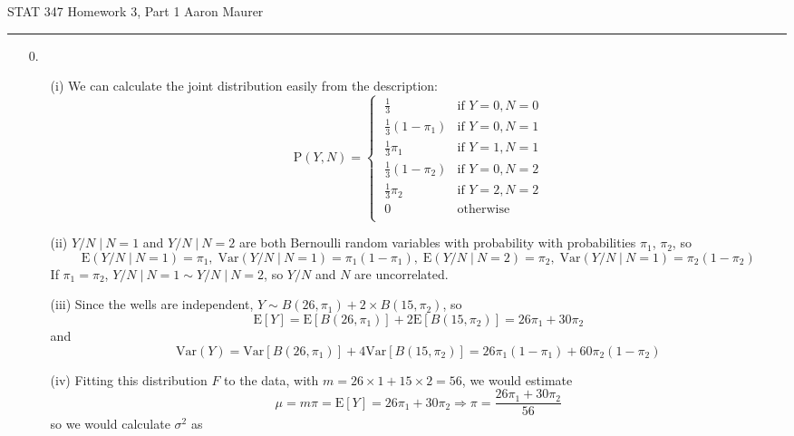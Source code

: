 \documentclass[11pt]{article}
\newcommand{\p}{\mathrm{P}}
\newcommand{\E}{\mathrm{E}}
\newcommand{\var}{\mathrm{Var}}
\newcommand{\st}{ \; \big | \:}
\theoremstyle{definition}
\newcommand{\hwhead}[1]{#1 \hfill Aaron Maurer \vspace{2mm} \hrule \vspace{2mm}}
\begin{document}
\hwhead{STAT 347 Homework 3, Part 1}
\begin{itemize}
    \item[0.]
        \begin{itemize}
            \item[(i)]
                We can calculate the joint distribution easily from the description:
                \[\p(Y,N) = \begin{cases} 
                              \;            \frac{1}{3} &\mbox{if } Y=0,N=0 \\
                              \;   \frac{1}{3}(1-\pi_1) &\mbox{if } Y=0,N=1 \\
                              \;       \frac{1}{3}\pi_1 &\mbox{if } Y=1,N=1 \\
                              \;   \frac{1}{3}(1-\pi_2) &\mbox{if } Y=0,N=2 \\
                              \;       \frac{1}{3}\pi_2 &\mbox{if } Y=2,N=2 \\
                              \;            0           &\mbox{otherwise } \\
                            \end{cases} \]
            \item[(ii)]
                $Y/N \st N=1$ and $Y/N \st N=2$ are both Bernoulli random variables with probability with probabilities $\pi_1$, $\pi_2$, so 
                \[\E(Y/N \st N=1) = \pi_1,\; \var(Y/N \st N=1) = \pi_1(1-\pi_1),\;\E(Y/N \st N=2) = \pi_2,\; \var(Y/N \st N=1) = \pi_2(1-\pi_2) \]
                If $\pi_1=\pi_2$, $Y/N \st N=1 \sim Y/N \st N=2$, so $Y/N$ and $N$ are uncorrelated.
            \item[(iii)]
                Since the wells are independent, $Y\sim B(26,\pi_1)+2\times B(15,\pi_2)$, so
                \[ \E[Y] = \E[B(26,\pi_1)] + 2\E[B(15,\pi_2)] = 26\pi_1 + 30\pi_2\]
                and
                \[ \var(Y) = \var[B(26,\pi_1)] + 4 \var[B(15,\pi_2)] = 26\pi_1(1-\pi_1) + 60\pi_2(1-\pi_2)\]
            \item[(iv)]
                Fitting this distribution $F$ to the data, with $m=26\times1 + 15\times 2 = 56$, we would estimate 
                \[ \mu = m\pi = \E[Y] = 26\pi_1 + 30\pi_2 \Longrightarrow \pi = \frac{26\pi_1 + 30\pi_2}{56}\] 
                so we would calculate $\sigma^2$ as
                \begin{align*}

\end{align*}
\end{itemize}
\end{itemize}
\end{document}
